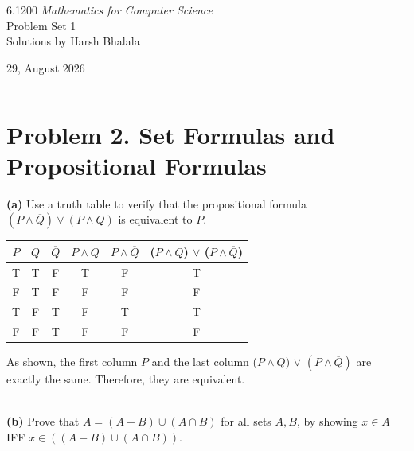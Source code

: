 \documentclass{article}
\begin{document}
\noindent
\begin{minipage}[t]{0.68\textwidth}
    {\large 6.1200 \textit{Mathematics for Computer Science}}\\[4pt]
    {\large Problem Set 1}\\[4pt]
    {\large Solutions by Harsh Bhalala}
\end{minipage}%
\hfill
\begin{minipage}[t]{0.27\textwidth}
    \raggedleft
    {\large 29, August 2026}
\end{minipage}

\vspace{6pt}

\noindent\rule{\textwidth}{0.5pt}

\vspace{12pt}

\section*{Problem 2. Set Formulas and Propositional Formulas}

\textbf{(a)} Use a truth table to verify that the propositional formula $(P \land \overline{Q}) \lor  (P \land Q)$ is equivalent to $P$.

\begin{center}
\begin{tabular}{c|c|c|c|c|c}
$P$ & $Q$ & $\overline{Q}$ & $P \land Q$ & $P \land \overline{Q} $ & ($P \land Q$) $\lor$ ($P \land \overline{Q} $)\\ 
\hline
T & T & F & T & F & T\\
F & T & F & F & F & F\\
T & F & T & F & T & T\\
F & F & T & F & F & F\\
\end{tabular}
\end{center}
As shown, the first column $P$ and the last column ($P \land Q$) $\lor$ $(P \land \overline{Q})$ are exactly the same. Therefore, they are equivalent.

~\\
\textbf{(b)} Prove that $A = (A - B) \cup (A \cap B)$ for all sets $A, B$, by showing $x \in A$ IFF $x \in ((A - B) \cup (A \cap B))$.
\end{document}
